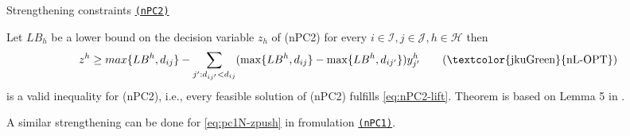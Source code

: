 \documentclass[utf8,aspectratio=169,ngerman,english]{beamer}
\renewcommand{\emph}[1]{\textcolor{jkuGreen}{#1}}
\newcommand{\nPC}{\hyperref[eq:nPC]{\texttt{(nPC1)}}}
\newcommand{\nPCY}{\hyperref[eq:nPCY]{\texttt{(nPC2)}}}
\begin{document}

\begin{frame}{Strengthening constraints \nPCY}
    \vspace{-2pt}
    \begin{lemma}\label{theorem:strength}
        Let $LB_h$ be a lower bound on the decision variable $z_h$ of (nPC2) for every $i \in \mathcal I, j \in \mathcal J, h \in \mathcal H$ then
        \begin{equation}
            z^h \geq max\{LB^h, d_{ij}\} - \sum_{j':d_{ij'} < d_{ij}} (\max \{\textit{$LB^h$}, d_{ij}\} - \max \{\textit{$LB^h$}, d_{ij'}\})y_{j'}^h  \label{eq:nPC2-lift} \tag{\emph{nL-OPT}}
        \end{equation}
        is a valid inequality for (nPC2), i.e., every feasible solution of (nPC2) fulfills \eqref{eq:nPC2-lift}.
        Theorem is based on Lemma 5 in \textcite{GAAR2022}.
    \end{lemma}
    A similar strengthening can be done for \eqref{eq:pc1N-zpush} in fromulation \nPC.
\end{frame}
\end{document}
